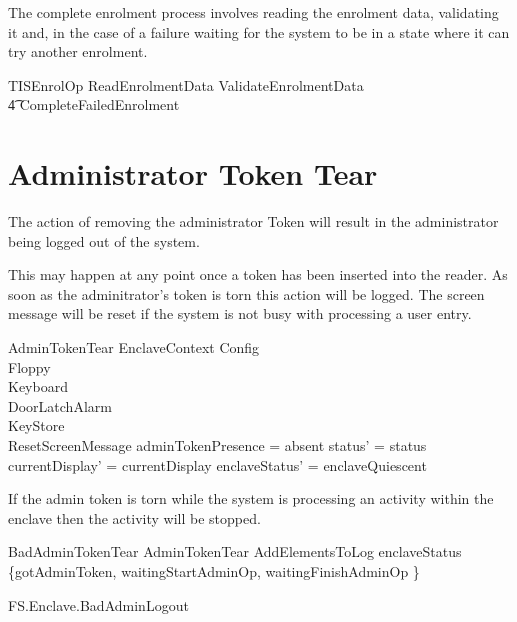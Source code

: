 The complete enrolment process involves reading the enrolment data,
validating it and, in the case of a failure waiting for the system to
be in a state where it can try another enrolment.

\begin{zed}
        TISEnrolOp  ReadEnrolmentData \lor
ValidateEnrolmentData 
\\      \t4 \lor CompleteFailedEnrolment
\end{zed}

\section{Administrator Token Tear}

The action of removing the administrator Token will result in the
administrator being logged out of the system.

This may happen at any point once a token has been inserted into the
reader. As soon as the adminitrator's token is torn this action will
be logged. The screen message will be reset if the system is not busy
with processing a user entry.

\begin{schema}{AdminTokenTear}
         EnclaveContext
\also
        \Xi Config
\\      \Xi Floppy
\\      \Xi Keyboard
\\      \Xi DoorLatchAlarm
\\      \Xi KeyStore
\\      ResetScreenMessage
\where
        adminTokenPresence = absent
\also   
        status' = status
\\      currentDisplay' = currentDisplay
\also
        enclaveStatus' = enclaveQuiescent
\end{schema}

If the admin token is torn while the system is processing an activity
within the enclave then the activity will be stopped.

\begin{schema}{BadAdminTokenTear} 
        AdminTokenTear
\also
        AddElementsToLog
\where
        enclaveStatus \in \{gotAdminToken, waitingStartAdminOp, waitingFinishAdminOp \}
\end{schema}

\begin{traceunit}{FS.Enclave.BadAdminLogout}
\end{traceunit}

